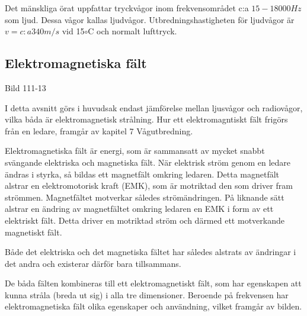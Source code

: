 Det mänskliga örat uppfattar tryckvågor inom frekvensområdet c:a $15-18000 Hz$ som ljud.
Dessa vågor kallas ljudvågor. Utbredningshastigheten för ljudvågor är $v = c:a 340 m/s$ vid 
15$\circ$C och normalt lufttryck.

\subsection{Elektromagnetiska fält}

Bild 111-13

I detta avsnitt görs i huvudsak endast jämförelse mellan ljusvågor och radiovågor, vilka
båda är elektromagnetisk strålning. Hur ett elektromagntiskt fält frigörs från en ledare,
framgår av kapitel 7 Vågutbredning.

Elektromagnetiska fält är energi, som är sammansatt av mycket snabbt svängande elektriska
och magnetiska fält. När elektrisk ström genom en ledare ändras i styrka, så bildas ett
magnetfält omkring ledaren. Detta magnetfält alstrar en elektromotorisk kraft (EMK), som
är motriktad den som driver fram strömmen. Magnetfältet motverkar således strömändringen.
På liknande sätt alstrar en ändring av magnetfältet omkring ledaren en EMK i form av ett
elektriskt fält. Detta driver en motriktad ström och därmed ett motverkande magnetiskt
fält.

Både det elektriska och det magnetiska fältet har således alstrats av ändringar i det
andra och existerar därför bara tillsammans.

De båda fälten kombineras till ett elektromagnetiskt fält, som har egenskapen att kunna
stråla (breda ut sig) i alla tre dimensioner. Beroende på frekvensen har
elektromagnetiska fält olika egenskaper och användning, vilket framgår av bilden.



